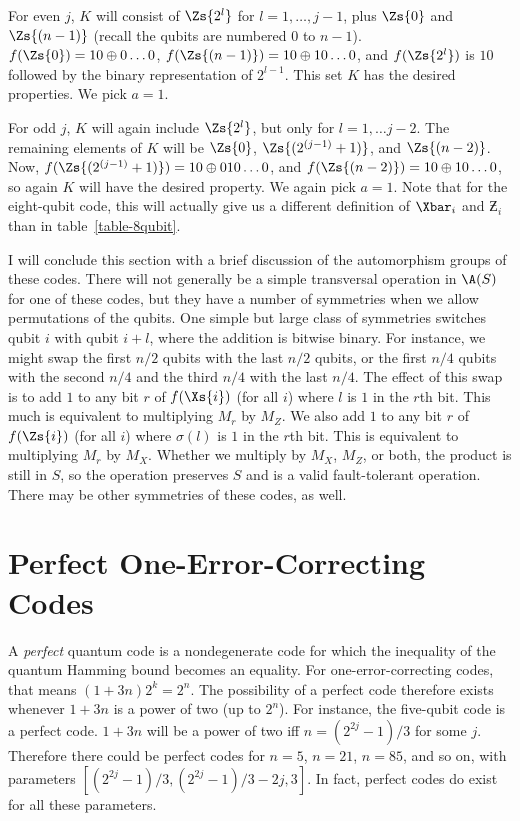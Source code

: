For even $j$, $K$ will consist of $\Zs{2^l}$ for $l = 1, \ldots, j-1$, plus
$\Zs{0}$ and $\Zs{(n-1)}$ (recall the qubits are numbered $0$ to $n-1$).  $f
(\Zs{0}) = 1 0 \oplus 0 \ldots 0$, $f (\Zs{(n-1)}) = 10 \oplus 1 0 \ldots 0$,
and $f (\Zs{2^l})$ is $1 0$ followed by the binary representation of $2^{l-1}$.
This set $K$ has the desired properties.  We pick $a=1$.

For odd $j$, $K$ will again include $\Zs{2^l}$, but only for $l = 1, \ldots j-
2$.  The remaining elements of $K$ will be $\Zs{0}$, $\Zs{(2^{(j-1)} + 1)}$,
and $\Zs{(n-2)}$.  Now, $f(\Zs{(2^{(j-1)}+1)}) = 1 0 \oplus 0 1 0 \ldots 0$,
and $f (\Zs{(n-2)}) = 1 0 \oplus 1 0 \ldots 0$, so again $K$ will have the
desired property.  We again pick $a=1$.  Note that for the eight-qubit code,
this will actually give us a different definition of $\Xbar_i$ and $\Zbar_i$
than in table~\ref{table-8qubit}.

I will conclude this section with a brief discussion of the automorphism
groups of these codes.  There will not generally be a simple transversal
operation in $\A(S)$ for one of these codes, but they have a number of
symmetries when we allow permutations of the qubits.  One simple but
large class of symmetries switches qubit $i$ with qubit $i + l$, where the
addition is bitwise binary.  For instance, we might swap the first $n/2$
qubits with the last $n/2$ qubits, or the first $n/4$ qubits with the second
$n/4$ and the third $n/4$ with the last $n/4$.  The effect of this swap is
to add $1$ to any bit $r$ of $f(\Xs{i})$ (for all $i$) where $l$ is $1$ in the
$r$th bit.  This much is equivalent to multiplying $M_r$ by $M_Z$.  We
also add $1$ to any bit $r$ of $f(\Zs{i})$ (for all $i$) where $\sigma (l)$ is
$1$ in the $r$th bit.  This is equivalent to multiplying $M_r$ by $M_X$.
Whether we multiply by $M_X$, $M_Z$, or both, the product is still in $S$,
so the operation preserves $S$ and is a valid fault-tolerant operation.
There may be other symmetries of these codes, as well.

\section{Perfect One-Error-Correcting Codes}
\label{sec-perfect}

A {\em perfect} quantum code is a nondegenerate code for which the
inequality of the quantum Hamming bound becomes an equality.  For
one-error-correcting codes, that means $(1+3n)2^k = 2^n$.  The possibility
of a perfect code therefore exists whenever $1+3n$ is a power of two (up
to $2^n$).  For instance, the five-qubit code is a perfect code.  $1+3n$ will
be a power of two iff $n = (2^{2j} - 1)/3$ for some $j$.  Therefore there could
be perfect codes for $n=5$, $n=21$, $n=85$, and so on, with parameters
$[(2^{2j}-1)/3, (2^{2j}-1)/3 - 2j, 3]$.  In fact, perfect codes do exist for
all these parameters.

